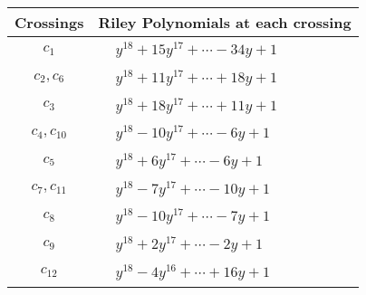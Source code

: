 \documentclass[1p]{elsarticle_modified}
\theoremstyle{definition}
\begin{document}
\begin{tabular}{m{50pt}|m{274pt}}
Crossings & \hspace{64pt}Riley Polynomials at each crossing \\
\hline $$\begin{aligned}c_{1}\end{aligned}$$&$\begin{aligned}
&y^{18}+15 y^{17}+\cdots-34 y+1
\end{aligned}$\\
\hline $$\begin{aligned}c_{2},c_{6}\end{aligned}$$&$\begin{aligned}
&y^{18}+11 y^{17}+\cdots+18 y+1
\end{aligned}$\\
\hline $$\begin{aligned}c_{3}\end{aligned}$$&$\begin{aligned}
&y^{18}+18 y^{17}+\cdots+11 y+1
\end{aligned}$\\
\hline $$\begin{aligned}c_{4},c_{10}\end{aligned}$$&$\begin{aligned}
&y^{18}-10 y^{17}+\cdots-6 y+1
\end{aligned}$\\
\hline $$\begin{aligned}c_{5}\end{aligned}$$&$\begin{aligned}
&y^{18}+6 y^{17}+\cdots-6 y+1
\end{aligned}$\\
\hline $$\begin{aligned}c_{7},c_{11}\end{aligned}$$&$\begin{aligned}
&y^{18}-7 y^{17}+\cdots-10 y+1
\end{aligned}$\\
\hline $$\begin{aligned}c_{8}\end{aligned}$$&$\begin{aligned}
&y^{18}-10 y^{17}+\cdots-7 y+1
\end{aligned}$\\
\hline $$\begin{aligned}c_{9}\end{aligned}$$&$\begin{aligned}
&y^{18}+2 y^{17}+\cdots-2 y+1
\end{aligned}$\\
\hline $$\begin{aligned}c_{12}\end{aligned}$$&$\begin{aligned}
&y^{18}-4 y^{16}+\cdots+16 y+1
\end{aligned}$\\
\hline
\end{tabular}\\~\\
\end{document}
